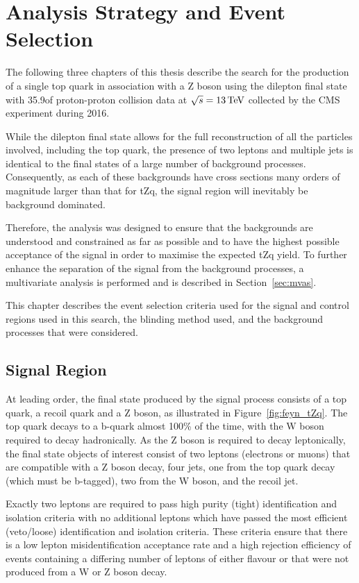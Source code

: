 \chapter{Analysis Strategy and Event Selection}\label{chapter:tzq-search}
The following three chapters of this thesis describe the search for the production of a single top quark in association with a Z boson using the dilepton final state with 35.9\fbinv of proton-proton collision data at $\sqrt{s} = 13\,\text{Te\hspace{-.08em}V}$ collected by the CMS experiment during 2016.

While the dilepton final state allows for the full reconstruction of all the particles involved, including the top quark, the presence of two leptons and multiple jets is identical to the final states of a large number of background processes.
Consequently, as each of these backgrounds have cross sections many orders of magnitude larger than that for tZq, the signal region will inevitably be background dominated.

Therefore, the analysis was designed to ensure that the backgrounds are understood and constrained as far as possible and to have the highest possible acceptance of the signal in order to maximise the expected tZq yield.
To further enhance the separation of the signal from the background processes, a multivariate analysis is performed and is described in Section~\ref{sec:mvas}.

This chapter describes the event selection criteria used for the signal and control regions used in this search, the blinding method used, and the background processes that were considered.

\section{Signal Region}\label{sec:signalRegion}
At leading order, the final state produced by the signal process consists of a top quark, a recoil quark and a Z boson, as illustrated in Figure~\ref{fig:feyn_tZq}.
The top quark decays to a b-quark almost 100\% of the time, with the W boson required to decay hadronically.
As the Z boson is required to decay leptonically, the final state objects of interest consist of two leptons (electrons or muons) that are compatible with a Z boson decay, four jets, one from the top quark decay (which must be b-tagged), two from the W boson, and the recoil jet.

Exactly two leptons are required to pass high purity (tight) identification and isolation criteria with no additional leptons which have passed the most efficient (veto/loose) identification and isolation criteria.
These criteria ensure that there is a low lepton misidentification acceptance rate and a high rejection efficiency of events containing a differing number of leptons of either flavour or that were not produced from a W or Z boson decay.

